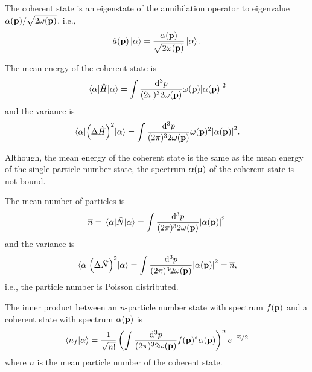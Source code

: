 \begin{theorem}\label{thm:coherent_state_annihilation_eigenvalue}
	The coherent state is an eigenstate of the annihilation operator to eigenvalue $\alpha(\vb{p})/\sqrt{2\omega(\vb{p})}$, i.e.,
	\begin{equation}
		\hat{a}(\vb{p})
		\ket{\alpha}
		=
		\frac{\alpha(\vb{p})}{\sqrt{2\omega(\vb{p})}}
		\ket{\alpha}
		.
	\end{equation}
\end{theorem}
\begin{lemma}\label{thm:coherent_state_energy_observable}
	The mean energy of the coherent state is
	\begin{equation}
		\expval{\hat{H}}{\alpha}
		=
		\int\frac{\dd[3]{p}}{(2\pi)^32\omega(\vb{p})}
		\omega(\vb{p})
		\abs{\alpha(\vb{p})}^2
	\end{equation}
	and the variance is
	\begin{equation}
		\expval{\left(\Delta\hat{H}\right)^2}{\alpha}
		=
		\int\frac{\dd[3]{p}}{(2\pi)^32\omega(\vb{p})}
		\omega(\vb{p})^2
		\abs{\alpha(\vb{p})}^2
		.
	\end{equation}
\end{lemma}
Although, the mean energy of the coherent state is the same as the mean energy of the single-particle number state, the spectrum $\alpha(\vb{p})$ of the coherent state is not bound.
\begin{lemma}\label{thm:coherent_state_number_observable}
	The mean number of particles is
	\begin{equation}
		\overline{n}
		=
		\expval{\hat{N}}{\alpha}
		=
		\int\frac{\dd[3]{p}}{(2\pi)^32\omega(\vb{p})}
		\abs{\alpha(\vb{p})}^2
	\end{equation}
	and the variance is
	\begin{equation}
		\expval{\left(\Delta\hat{N}\right)^2}{\alpha}
		=
		\int\frac{\dd[3]{p}}{(2\pi)^32\omega(\vb{p})}
		\abs{\alpha(\vb{p})}^2
		=
		\overline{n}
		,
	\end{equation}
	i.e., the particle number is Poisson distributed.
\end{lemma}
\begin{lemma}\label{thm:coherent_state_number_state_inner_product}
	The inner product between an $n$-particle number state with spectrum $f(\vb{p})$ and a coherent state with spectrum $\alpha(\vb{p})$ is
	\begin{equation}
		\braket{n_f}{\alpha}
		=
		\frac{1}{\sqrt{n!}}
		\left(
			\int\frac{\dd[3]{p}}{(2\pi)^32\omega(\vb{p})}
			f(\vb{p})^*
			\alpha(\vb{p})
		\right)^n
		e^{-\overline{n}/2}
	\end{equation}
	where $\overline{n}$ is the mean particle number of the coherent state.
\end{lemma}
